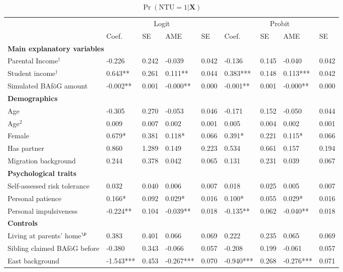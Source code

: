 \begin{table}
\caption*{$\Pr(\mathrm{NTU} = 1 | \mathbf{X})$}
\renewcommand{\arraystretch}{1.25}
\footnotesize
\centering
\begin{tabular}{lllllllll}
\toprule
 & \multicolumn{4}{c}{Logit} & \multicolumn{4}{c}{Probit} \\
\cmidrule(lr){2-5} \cmidrule(lr){6-9}
 & Coef. & SE & AME & SE & Coef. & SE & AME & SE \\
\midrule
\multicolumn{9}{l}{\textbf{Main explanatory variables}} \\
Parental Income$^\dagger$ & -0.226 & 0.242 & -0.039 & 0.042 & -0.136 & 0.145 & -0.040 & 0.042 \\
Student income$^\dagger$ & 0.643** & 0.261 & 0.111** & 0.044 & 0.383*** & 0.148 & 0.113*** & 0.042 \\
Simulated BAföG amount & -0.002** & 0.001 & -0.000** & 0.000 & -0.001** & 0.001 & -0.000** & 0.000 \\
\midrule
\multicolumn{9}{l}{\textbf{Demographics}} \\
Age & -0.305 & 0.270 & -0.053 & 0.046 & -0.171 & 0.152 & -0.050 & 0.044 \\
Age$^2$ & 0.009 & 0.007 & 0.002 & 0.001 & 0.005 & 0.004 & 0.002 & 0.001 \\
Female & 0.679* & 0.381 & 0.118* & 0.066 & 0.391* & 0.221 & 0.115* & 0.066 \\
Has partner & 0.860 & 1.289 & 0.149 & 0.223 & 0.534 & 0.661 & 0.157 & 0.194 \\
Migration background & 0.244 & 0.378 & 0.042 & 0.065 & 0.131 & 0.231 & 0.039 & 0.067 \\
\midrule
\multicolumn{9}{l}{\textbf{Psychological traits}} \\
Self-assessed risk tolerance & 0.032 & 0.040 & 0.006 & 0.007 & 0.018 & 0.025 & 0.005 & 0.007 \\
Personal patience & 0.166* & 0.092 & 0.029* & 0.016 & 0.100* & 0.055 & 0.029* & 0.016 \\
Personal impulsiveness & -0.224** & 0.104 & -0.039** & 0.018 & -0.135** & 0.062 & -0.040** & 0.018 \\
\midrule
\multicolumn{9}{l}{\textbf{Controls}} \\
Living at parents’ home$^\P$ & 0.383 & 0.401 & 0.066 & 0.069 & 0.222 & 0.235 & 0.065 & 0.069 \\
Sibling claimed BAföG before & -0.380 & 0.343 & -0.066 & 0.057 & -0.208 & 0.199 & -0.061 & 0.057 \\
East background & -1.543*** & 0.453 & -0.267*** & 0.070 & -0.940*** & 0.268 & -0.276*** & 0.071 \\

\end{tabular}
\end{table}
